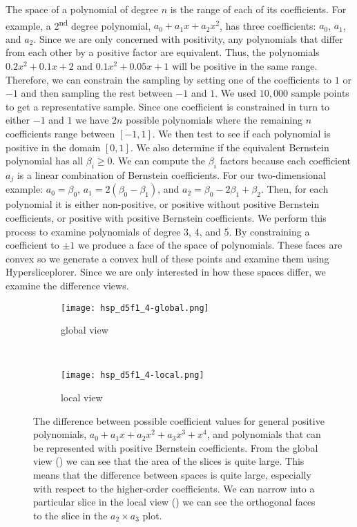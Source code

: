 The space of a polynomial of degree \(n\) is the range of each of its
coefficients. For example, a 2\textsuperscript{nd} degree polynomial, \(a_0
+ a_1 x + a_2 x^2\), has three coefficients: \(a_0\), \(a_1\), and \(a_2\).
Since we are only concerned with positivity, any polynomials that differ from
each other by a positive factor are equivalent. Thus, the polynomials
$0.2x^2 + 0.1x + 2$ and $0.1x^2 + 0.05x + 1$ will be positive in the same
range. Therefore, we can constrain the sampling by setting one of the
coefficients to $1$ or $-1$ and then sampling the rest between $-1$ and $1$.
We used $10,000$ sample points to get a representative sample.
Since one coefficient is constrained in turn to
either \(-1\) and \(1\) we have \(2n\) possible polynomials where the remaining
\(n\) coefficients range between \([-1,1]\). We then test to see if each
polynomial is positive in the domain \([0,1]\). We also determine if the
equivalent Bernstein polynomial has all \(\beta_i \ge 0\). We can compute the
\(\beta_i\) factors because each coefficient \(a_j\) is a linear combination of
Bernstein coefficients. For our two-dimensional example: \(a_0 = \beta_0\),
\(a_1 = 2(\beta_0-\beta_1)\), and \(a_2=\beta_0 - 2\beta_1 + \beta_2\). Then,
for each polynomial it is either non-positive, or positive without positive Bernstein coefficients, or positive with 
positive Bernstein coefficients. We perform this process to examine polynomials of
degree 3, 4, and 5. By constraining a coefficient to $\pm 1$ we produce a
face of the space of polynomials. These faces are convex so we generate a
convex hull of these points and examine them using Hypersliceplorer. Since we
are only interested in how these spaces differ, we examine the difference views.

\begin{figure}
  \centering
  \begin{subfigure}[b]{0.45\linewidth}
    \texttt{[image: hsp\_d5f1\_4-global.png]}
    \caption{global view}
    \label{fig:spacediff:global}
  \end{subfigure}
  ~
  \begin{subfigure}[b]{0.45\linewidth}
    \texttt{[image: hsp\_d5f1\_4-local.png]}
    \caption{local view}
    \label{fig:spacediff:local}
  \end{subfigure}
  \caption{
    The difference between possible coefficient values for general positive 
    polynomials, $a_0 + a_1 x + a_2 x^2 + a_3 x^3 + x^4$, and polynomials
    that can be represented with positive Bernstein coefficients. From the 
    global view () we can see that the 
    area of the slices is quite large. This means that the 
    difference between spaces is quite large, especially with respect to the
    higher-order coefficients. We can narrow into a particular slice in
    the local view () we can see 
    the orthogonal faces to the slice in the $a_2 \times a_3$ plot.
  }
  \label{fig:spacediff}
\end{figure}

